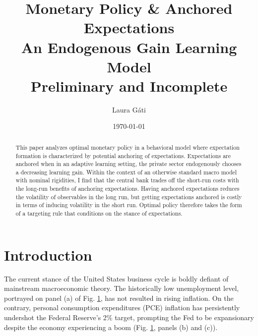 \documentclass[11pt]{article}
\def \myFigPath {../../figures/}
\renewcommand{\[}{\begin{equation}}
\renewcommand{\]}{\end{equation}}
\def\mySmallerFigScale{0.18}
\begin{document}
\title{Monetary Policy \& Anchored Expectations \\
An Endogenous Gain Learning Model \\
\vspace{0.8cm}
\small{Preliminary and Incomplete}}
\author{Laura G\'ati} 
\date{\today}
\maketitle


\begin{abstract}
This paper analyzes optimal monetary policy in a behavioral model where expectation formation is characterized by potential anchoring of expectations. Expectations are anchored when in an adaptive learning setting, the private sector endogenously chooses a decreasing learning gain. Within the context of an otherwise standard macro model with nominal rigidities, I find that the central bank trades off the short-run costs with the long-run benefits of anchoring expectations. Having anchored expectations reduces the volatility of observables in the long run, but getting expectations anchored is costly in terms of inducing volatility in the short run. Optimal policy therefore takes the form of a targeting rule that conditions on the stance of expectations.   
\end{abstract}



\newpage
\section{Introduction}\label{introduction}

The current stance of the United States business cycle is boldly defiant of mainstream macroeconomic theory. The historically low unemployment level, portrayed on panel (a) of Fig. \ref{urate_pce_ffr}, has not resulted in rising inflation. On the contrary, personal consumption expenditures (PCE) inflation has persistently undershot the Federal Reserve's 2\% target, prompting the Fed to be expansionary despite the economy experiencing a boom (Fig. \ref{urate_pce_ffr}, panels (b) and (c)).

\begin{figure}[h!]
\caption{}
\label{urate_pce_ffr}
\end{figure}
\end{document}
